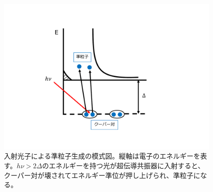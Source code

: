 \begin{figure}[htbp]
  \centering
  \includegraphics[width=0.6\columnwidth]{3_GB/figs/cooper.pdf}
  \caption{入射光子による準粒子生成の模式図。縦軸は電子のエネルギーを表す。$h\nu > 2\Delta$のエネルギーを持つ光が超伝導共振器に入射すると、クーパー対が壊されてエネルギー準位が押し上げられ、準粒子になる。}
  \label{cooper}
\end{figure}

